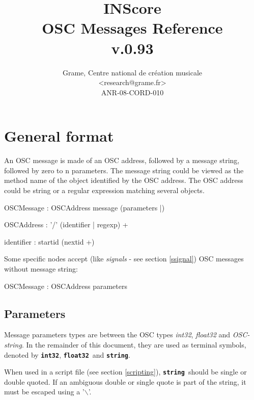 \documentclass[a4paper,twoside]{report}
\newcommand{\toplevel}[1]	{\chapter{#1}}
\newcommand{\sublevel}[1]	{\section{#1}}
\newcommand{\osctype}[1]{\textbf{\texttt{{\small #1}}}}
\newcommand{\oscint}{\osctype{int32}}
\newcommand{\oscfloat}{\osctype{float32}}
\newcommand{\oscstring}{\osctype{string}}
\begin{document}
\title{INScore \\ OSC Messages Reference \\v.0.93}

\author{Grame, Centre national de cr\'eation musicale\\
{\small <research@grame.fr>} \\
\vspace{2mm}
ANR-08-CORD-010
}

\maketitle

\pagestyle{empty}
\cleardoublepage
\tableofcontents
\newpage
\pagestyle{plain}
\setcounter{page}{1}

\toplevel{General format}
\label{genformat}
An OSC message is made of an OSC address, followed by a message string, followed by zero to n parameters. The message string could be viewed as the method name of the object identified by the OSC address.
The OSC address could be string or a regular expression matching several objects.
\begin{rail}
OSCMessage : OSCAddress message (parameters |)
\end{rail}

\begin{rail}
OSCAddress : '/' (identifier | regexp) +
\end{rail}

\railalias{nextid}{[-\_a-zA-Z0-9]]}
\begin{rail}
identifier : startid (nextid +)
\end{rail}

Some specific nodes accept (like \emph{signals} - see section \ref{ssignal}) OSC messages without message string:
\begin{rail}
OSCMessage : OSCAddress parameters
\end{rail}

\sublevel{Parameters}

Message parameters types are between the OSC types \emph{int32}, \emph{float32} and \emph{OSC-string}. In the remainder of this document, they are used as terminal symbols, denoted by \oscint, \oscfloat\ and \oscstring. 

When used in a script file (see section \ref{scripting}), \oscstring\ should be single or double quoted.
If an ambiguous double or single quote is part of the string, it must be escaped using a '$\backslash$'.
\end{document}
